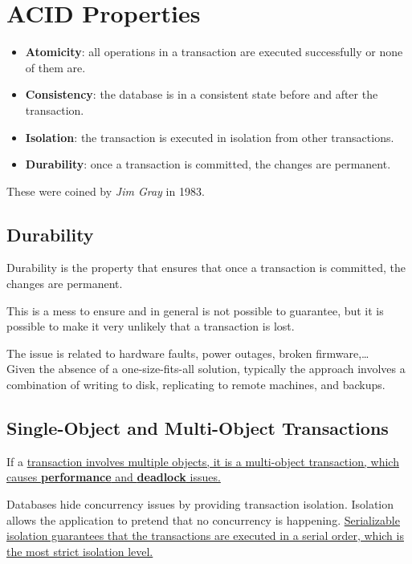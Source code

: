 \section{ACID Properties}

\begin{itemize}
    \item \textbf{Atomicity}: all operations in a transaction are executed successfully or none of them are.
    \item \textbf{Consistency}: the database is in a consistent state before and after the transaction.
    \item \textbf{Isolation}: the transaction is executed in isolation from other transactions.
    \item \textbf{Durability}: once a transaction is committed, the changes are permanent.
\end{itemize}

These were coined by \textit{Jim Gray} in 1983.

\subsection{Durability}
Durability is the property that ensures that once a transaction is committed, the changes are permanent.

This is a mess to ensure and in general is not possible to guarantee, but it is possible to make it very unlikely that a transaction is lost.

The issue is related to hardware faults, power outages, broken firmware,\dots\\
Given the absence of a one-size-fits-all solution, typically the approach involves a combination of writing to disk, replicating to remote machines, and backups.

\subsection{Single-Object and Multi-Object Transactions}
If a \ul{transaction involves multiple objects, it is a multi-object transaction, which causes \textbf{performance} and \textbf{deadlock} issues.}


Databases hide concurrency issues by providing transaction isolation.
Isolation allows the application to pretend that no concurrency is happening.
\ul{Serializable isolation guarantees that the transactions are executed in a serial order, which is the most strict isolation level.}

